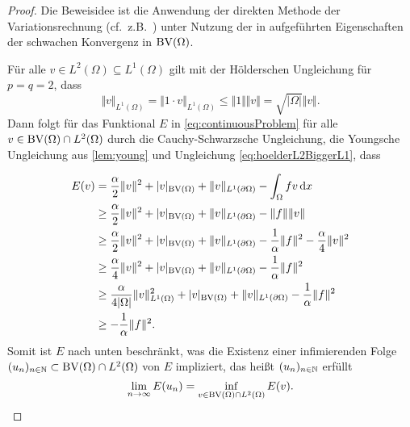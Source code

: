 \begin{proof}
  Die Beweisidee ist die Anwendung der direkten Methode der Variationsrechnung
  (cf.\ z.B.\ \cite{Dac89}) unter Nutzung der in 
  aufgeführten Eigenschaften der schwachen Konvergenz in $\textup{BV}(\Omega)$.

  Für alle $v\in L^2(\Omega)\subseteq L^1(\Omega)$ gilt mit der Hölderschen
  Ungleichung für $p=q=2$, dass
  \begin{equation}\label{eq:hoelderL2BiggerL1}
    \Vert v\Vert_{L^1(\Omega)} 
    = \Vert 1\cdot v\Vert_{L^1(\Omega)}
    \leq \Vert 1\Vert\Vert v\Vert
    =\sqrt{|\Omega|} \Vert v\Vert.
  \end{equation}
  Dann folgt für das Funktional $E$ in \eqref{eq:continuousProblem} für alle
  $v\in \textup{BV}(\Omega)\cap L^2(\Omega)$ durch die Cauchy-Schwarzsche Ungleichung,
  die Youngsche Ungleichung aus \cref{lem:young} und Ungleichung
  \eqref{eq:hoelderL2BiggerL1}, dass

  \begin{equation}
    \label{eq:contProbBddFromBelow}
    \begin{aligned}
      E(v)&=\frac{\alpha}{2}\Vert v\Vert^2 + |v|_{\textup{BV}(\Omega)}
      +\Vert v\Vert_{L^1(\partial\Omega)}-\int_\Omega fv\,\mathrm{d}x\\
      &\geq 
      \frac{\alpha}{2}\Vert v\Vert^2 + |v|_{\textup{BV}(\Omega)}
      +\Vert v\Vert_{L^1(\partial\Omega)}
      -\Vert f\Vert\Vert v\Vert\\
      &\geq 
      \frac{\alpha}{2}\Vert v\Vert^2 + |v|_{\textup{BV}(\Omega)}
      +\Vert v\Vert_{L^1(\partial\Omega)}
      -\frac{1}{\alpha}\Vert f\Vert^2
      -\frac{\alpha}{4}\Vert v\Vert^2\\
      &\geq 
      \frac{\alpha}{4}\Vert v\Vert^2 + |v|_{\textup{BV}(\Omega)}
      +\Vert v\Vert_{L^1(\partial\Omega)}-\frac{1}{\alpha}\Vert
      f\Vert^2\\
      &\geq 
      \frac{\alpha}{4|\Omega|}\Vert v\Vert_{L^1(\Omega)}^2 + |v|_{\textup{BV}(\Omega)}
      +\Vert v\Vert_{L^1(\partial\Omega)}-\frac{1}{\alpha}\Vert
      f\Vert^2\\
      &\geq -\frac{1}{\alpha}\Vert f\Vert^2.
    \end{aligned}
  \end{equation}
  Somit ist $E$ nach unten beschränkt, was die Existenz einer infimierenden
  Folge $(u_n)_{n\in\mathbb{N}}\subset\textup{BV}(\Omega)\cap L^2(\Omega)$ von $E$ 
  impliziert, das heißt
  $(u_n)_{n\in\mathbb{N}}$ erfüllt $$\lim_{n\rightarrow\infty}E(u_n) =
  \inf_{v\in\textup{BV}(\Omega)\cap L^2(\Omega)}E(v).$$ 


\end{proof}
